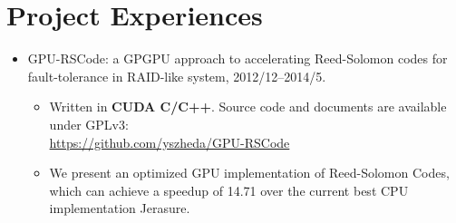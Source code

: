\documentclass[letterpaper]{article}
\begin{document}


\section*{Project Experiences}
\begin{itemize}
    \item GPU-RSCode: a GPGPU approach to accelerating Reed-Solomon codes for fault-tolerance in RAID-like system, 2012/12--2014/5.
        \begin{itemize}
            \item Written in \textbf{CUDA C/C++}. Source code and documents are available under GPLv3: \\ \url{https://github.com/yszheda/GPU-RSCode}
            \item We present an optimized GPU implementation of Reed-Solomon Codes, which can achieve a speedup of 14.71 over the current best CPU implementation Jerasure.
        \end{itemize}

\end{itemize}
\end{document}

